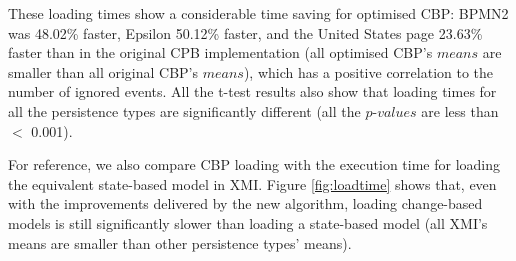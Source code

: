 \documentclass{llncs}
\begin{document}
{  
These loading times show a considerable time saving for optimised CBP: BPMN2 was 48.02\% faster, Epsilon 50.12\% faster, and the United States page 23.63\% faster than in the original CPB implementation (all optimised CBP's $means$ are  smaller than all original CBP's $means$), which has a positive correlation to the number of ignored events. All the t-test results also show that loading times for all the persistence types are significantly different (all the $p$-$values$ are less than  $<$ 0.001). 

For reference, we also compare CBP loading with the execution time for loading the equivalent state-based model in XMI. Figure \ref{fig:loadtime} shows that, even with the improvements delivered by the new algorithm, loading change-based models is still significantly slower than loading a state-based model (all XMI's means are smaller than other persistence types' means).

}
\end{document}
